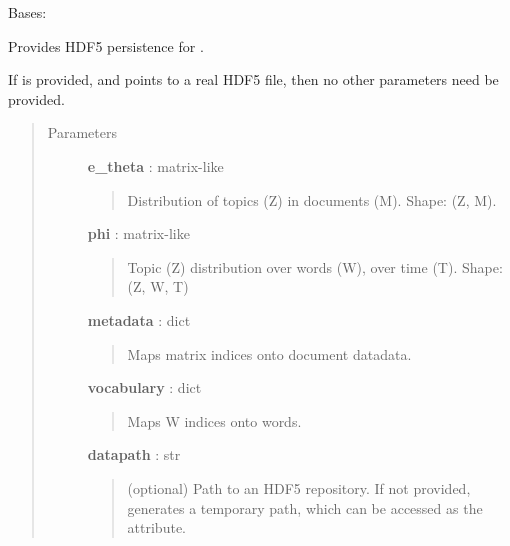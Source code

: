 \documentclass[letterpaper,10pt,english]{sphinxmanual}
\begin{document}
\begin{fulllineitems}
\label{tethne.persistence.hdf5.dtmmodel:tethne.persistence.hdf5.dtmmodel.HDF5DTMModel}
Bases: {\hyperref[tethne.model.corpus.dtmmodel:tethne.model.corpus.dtmmodel.DTMModel]{}}

Provides HDF5 persistence for {\hyperref[tethne.model.corpus.dtmmodel:tethne.model.corpus.dtmmodel.DTMModel]{}}.

If  is provided, and points to a real HDF5 file, then no other
parameters need be provided.
\begin{quote}\begin{description}
\item[{Parameters}] \leavevmode
\textbf{e\_theta} : matrix-like
\begin{quote}

Distribution of topics (Z) in documents (M). Shape: (Z, M).
\end{quote}

\textbf{phi} : matrix-like
\begin{quote}

Topic (Z) distribution over words (W), over time (T). Shape: 
(Z, W, T)
\end{quote}

\textbf{metadata} : dict
\begin{quote}

Maps matrix indices onto document datadata.
\end{quote}

\textbf{vocabulary} : dict
\begin{quote}

Maps W indices onto words.
\end{quote}

\textbf{datapath} : str
\begin{quote}

(optional) Path to an HDF5 repository. If not provided, generates
a temporary path, which can be accessed as the  attribute.
\end{quote}

\end{description}\end{quote}

\end{fulllineitems}
\end{document}
